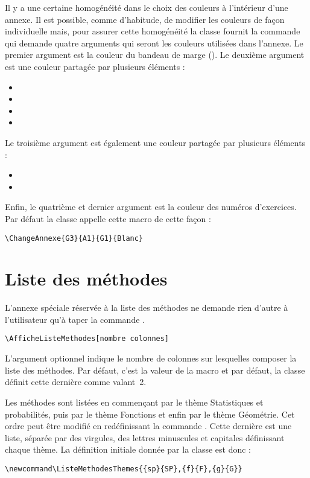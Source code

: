 \documentclass[nocrop]{sesamanuel}
\begin{document}
Il y a une certaine homogénéité dans le choix des couleurs à
l'intérieur d'une annexe. Il est possible, comme d'habitude, de
modifier les couleurs de façon individuelle mais, pour assurer cette
homogénéité la classe fournit la commande  qui
demande quatre arguments qui seront les couleurs utilisées dans
l'annexe. Le premier argument est la couleur du bandeau de marge
(). Le deuxième argument est une couleur
partagée par plusieurs éléments :
\begin{itemize}
\item {}
\item {}
\item {}
\item {}
\end{itemize}
Le troisième argument est également une couleur partagée par plusieurs
éléments :
\begin{itemize}
\item {}
\item {}
\end{itemize}
Enfin, le quatrième et dernier argument est la couleur des numéros
d'exercices. Par défaut la classe appelle cette macro de cette façon :
\begin{verbatim}
\ChangeAnnexe{G3}{A1}{G1}{Blanc}
\end{verbatim}
\clearpage
\section{Liste des méthodes}
\label{sec-liste-des-methodes}
L'annexe spéciale réservée à la liste des méthodes ne demande rien
d'autre à l'utilisateur qu'à taper la commande
.
\begin{syntaxe}
\begin{verbatim}
\AfficheListeMethodes[nombre colonnes]
\end{verbatim}
L'argument optionnel indique le nombre de colonnes sur lesquelles
composer la liste des méthodes. Par défaut, c'est la valeur de
la macro  et par défaut, la classe
définit cette dernière comme valant~2.
\end{syntaxe}

Les méthodes sont listées en commençant par le thème Statistiques et
probabilités, puis par le thème Fonctions et enfin par le thème
Géométrie. Cet ordre peut être modifié en redéfinissant la commande
. Cette dernière est une liste, séparée par
des virgules, des lettres minuscules et capitales définissant chaque
thème. La définition initiale donnée par la classe est donc :
\begin{verbatim}
\newcommand\ListeMethodesThemes{{sp}{SP},{f}{F},{g}{G}}
\end{verbatim}
\end{document}
